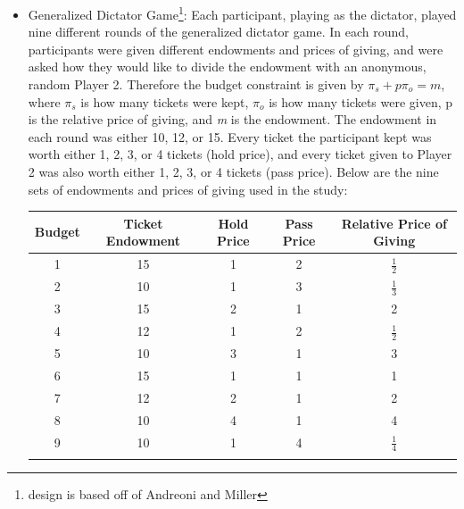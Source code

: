 \documentclass[12pt]{article}
\begin{document}
\begin{itemize}

\item{Generalized Dictator Game\footnote{design is based off of Andreoni and Miller}}:  Each participant, playing as the dictator, played nine different rounds of the generalized dictator game. In each round, participants were given different endowments and prices of giving, and were asked how they would like to divide the endowment with an anonymous, random Player 2. Therefore the budget constraint is given by \(\pi_{s} + p\pi_{o} = \textit{m}\), where \(\pi_{s}\) is how many tickets were kept, \(\pi_{o}\) is how many tickets were given, p is the relative price of giving, and \textit{m} is the endowment. The endowment in each round was either 10, 12, or 15. Every ticket the participant kept was worth either 1, 2, 3, or 4 tickets (hold price), and every ticket given to Player 2 was also worth either 1, 2, 3, or 4 tickets (pass price). Below are the nine sets of endowments and prices of giving used in the study:
\begin{center}
\begin{tabular}{ c c c c c }
\hline \hline
 Budget & Ticket Endowment & Hold Price & Pass Price & Relative Price of Giving \\ 
 \hline
1 & 15 & 1 & 2 & \(\frac{1}{2}\)  \\  
2 & 10 & 1 & 3 & \(\frac{1}{3}\)  \\  
3 & 15 & 2 & 1 & 2 \\  
4 & 12 & 1 & 2 & \(\frac{1}{2}\)  \\  
5 & 10 & 3 & 1 & 3  \\  
6 & 15 & 1 & 1 & 1  \\  
7 & 12 & 2 & 1 & 2 \\  
8 & 10 & 4 & 1 & 4 \\  
9 & 10 & 1 & 4 & \(\frac{1}{4}\)  \\  
\hline \hline \\
\end{tabular}
\end{center}


\end{itemize}
\end{document}

